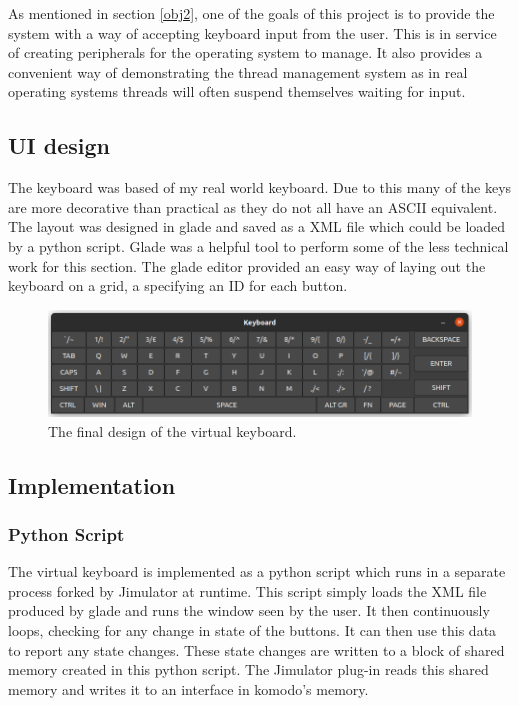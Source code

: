 \label{chap:virtualKeyboard}
As mentioned in section \ref{obj2}, one of the goals of this project is to provide the system with a way of accepting keyboard input from the user. This is in service of creating peripherals for the operating system to manage. It also provides a convenient way of demonstrating the thread management system as in real operating systems threads will often suspend themselves waiting for input.
\subsection{UI design}
The keyboard was based of my real world keyboard. Due to this many of the keys are more decorative than practical as they do not all have an ASCII \cite{ascii} equivalent. The layout was designed in glade \cite{glade} and saved as a XML file which could be loaded by a python script. Glade was a helpful tool to perform some of the less technical work for this section. The glade editor provided an easy way of laying out the keyboard on a grid, a specifying an ID for each button. 


\begin{figure}[ht!]
	\includegraphics[width=\linewidth]{figures/keyboard.png}
	\caption{The final design of the virtual keyboard.}
	\label{fig:keyboard}
\end{figure} 

\subsection{Implementation}
\subsubsection{Python Script}
The virtual keyboard is implemented as a python \cite{python} script which runs in a separate process forked by Jimulator at runtime. This script simply loads the XML file produced by glade and runs the window seen by the user. It then continuously loops, checking for any change in state of the buttons. It can then use this data to report any state changes.  These state changes are written to a block of shared memory created in this python script. The Jimulator plug-in reads this shared memory and writes it to an interface in komodo's memory.
